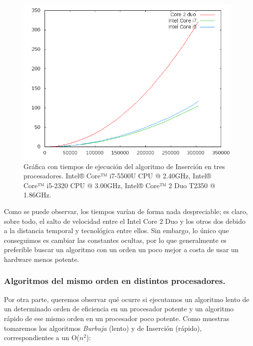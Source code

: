 \documentclass[11pt,a4paper]{article}
\begin{document}
				\begin{figure}[h]

					\centering
					\includegraphics[width=1\textwidth]{insercion_dtos_pcs.png}
					\caption{Gráfica con tiempos de ejecución del algoritmo de Inserción en tres procesadores. Intel® Core™ i7-5500U CPU @ 2.40GHz, Intel® Core™ i5-2320 CPU @ 3.00GHz, Intel® Core™ 2 Duo T2350 @ 1.86GHz.}

				\end{figure}

				\par
				Como se puede observar, los tiempos varían de forma nada despreciable; es claro, sobre todo, el salto de velocidad entre el Intel Core 2 Duo y los otros dos debido a la distancia temporal y tecnológica entre ellos. Sin embargo, lo único que conseguimos es cambiar las constantes ocultas, por lo que generalmente es preferible buscar un algoritmo con un orden un poco mejor a costa de usar un hardware menos potente.

\newpage

			\subsubsection{Algoritmos del mismo orden en distintos procesadores.}

				\par
				Por otra parte, queremos observar qué ocurre si ejecutamos un algoritmo lento de un determinado orden de eficiencia en un procesador potente y un algoritmo rápido de ese mismo orden en un procesador poco potente. Como muestras tomaremos los algoritmos \textit{Burbuja} (lento) y de Inserción (rápido), correspondientes a un O($n^2$): 
\end{document}
